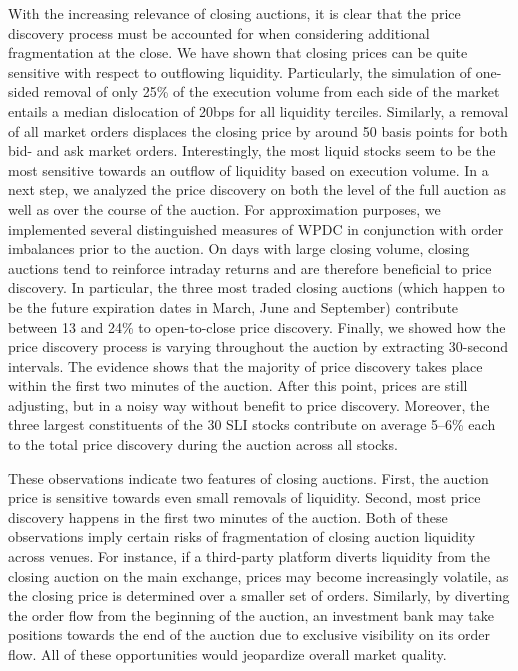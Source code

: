 \documentclass[11pt,a4paper, notitlepage]{article}
\begin{document}
	With the increasing relevance of closing auctions, it is clear that the price discovery process must be accounted for when considering additional fragmentation at the close. We have shown that closing prices can be quite sensitive with respect to outflowing liquidity. Particularly, the simulation of one-sided removal of only 25\% of the execution volume from each side of the market entails a median dislocation of 20bps for all liquidity terciles. Similarly, a removal of all market orders displaces the closing price by around 50 basis points for both bid- and ask market orders. Interestingly, the most liquid stocks seem to be the most sensitive towards an outflow of liquidity based on execution volume. In a next step, we analyzed the price discovery on both the level of the full auction as well as over the course of the auction. For approximation purposes, we implemented several distinguished measures of \acf{WPDC} in conjunction with order imbalances prior to the auction. On days with large closing volume, closing auctions tend to reinforce intraday returns and are therefore beneficial to price discovery. In particular, the three most traded closing auctions (which happen to be the future expiration dates in March, June and September) contribute between 13 and 24\% to open-to-close price discovery. Finally, we showed how the price discovery process is varying throughout the auction by extracting 30-second intervals. The evidence shows that the majority of price discovery takes place within the first two minutes of the auction. After this point, prices are still adjusting, but in a noisy way without benefit to price discovery. Moreover, the three largest constituents of the 30 \ac{SLI} stocks contribute on average 5--6\% each to the total price discovery during the auction across all stocks.
	
	These observations indicate two features of closing auctions. First, the auction price is sensitive towards even small removals of liquidity. Second, most price discovery happens in the first two minutes of the auction. Both of these observations imply certain risks of fragmentation of closing auction liquidity across venues. For instance, if a third-party platform diverts liquidity from the closing auction on the main exchange, prices may become increasingly volatile, as the closing price is determined over a smaller set of orders. Similarly, by diverting the order flow from the beginning of the auction, an investment bank may take positions towards the end of the auction due to exclusive visibility on its order flow. All of these opportunities would jeopardize overall market quality.
	
\end{document}
